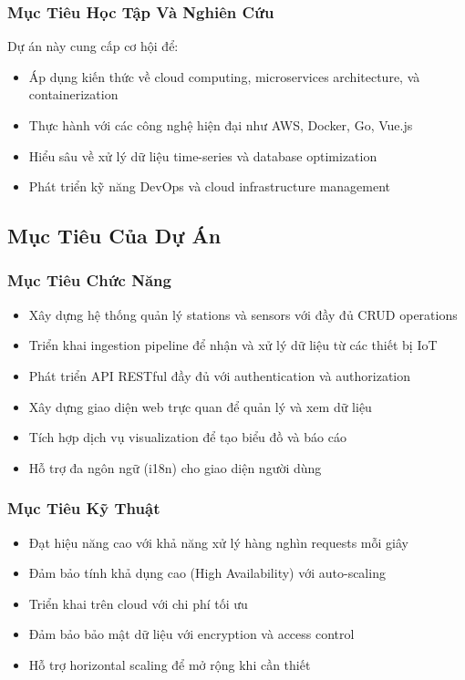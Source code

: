 \subsubsection{Mục Tiêu Học Tập Và Nghiên Cứu}

Dự án này cung cấp cơ hội để:

\begin{itemize}
    \item Áp dụng kiến thức về cloud computing, microservices architecture, và containerization
    \item Thực hành với các công nghệ hiện đại như AWS, Docker, Go, Vue.js
    \item Hiểu sâu về xử lý dữ liệu time-series và database optimization
    \item Phát triển kỹ năng DevOps và cloud infrastructure management
\end{itemize}

\subsection{Mục Tiêu Của Dự Án}

\subsubsection{Mục Tiêu Chức Năng}

\begin{itemize}
    \item Xây dựng hệ thống quản lý stations và sensors với đầy đủ CRUD operations
    \item Triển khai ingestion pipeline để nhận và xử lý dữ liệu từ các thiết bị IoT
    \item Phát triển API RESTful đầy đủ với authentication và authorization
    \item Xây dựng giao diện web trực quan để quản lý và xem dữ liệu
    \item Tích hợp dịch vụ visualization để tạo biểu đồ và báo cáo
    \item Hỗ trợ đa ngôn ngữ (i18n) cho giao diện người dùng
\end{itemize}

\subsubsection{Mục Tiêu Kỹ Thuật}

\begin{itemize}
    \item Đạt hiệu năng cao với khả năng xử lý hàng nghìn requests mỗi giây
    \item Đảm bảo tính khả dụng cao (High Availability) với auto-scaling
    \item Triển khai trên cloud với chi phí tối ưu
    \item Đảm bảo bảo mật dữ liệu với encryption và access control
    \item Hỗ trợ horizontal scaling để mở rộng khi cần thiết
\end{itemize}

